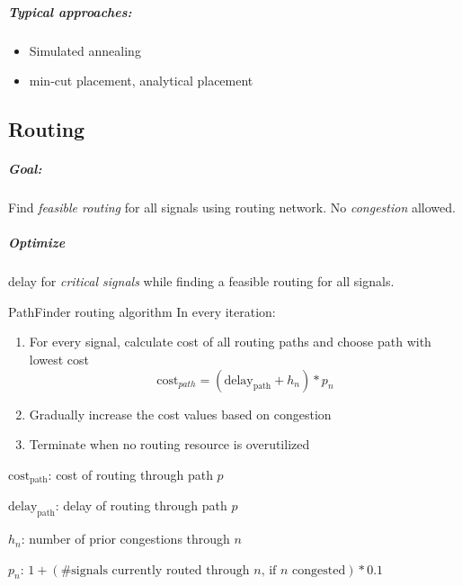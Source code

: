 \documentclass[a4paper]{article}
\begin{document}
\subparagraph{Typical approaches:}
\begin{itemize}
    \item Simulated annealing
    \item min-cut placement, analytical placement
\end{itemize}

\subsection{Routing}

\subparagraph{Goal:} Find \emph{feasible routing} for all signals using routing network. No \emph{congestion} allowed.

\subparagraph{Optimize} delay for \emph{critical signals} while finding a feasible routing for all signals.

\begin{mainbox}{PathFinder routing algorithm}
    In every iteration:
    \begin{enumerate}
        \item For every signal, calculate cost of all routing paths and choose path with lowest cost
        $$\text{cost}_{path} = (\text{delay}_\text{path} + h_n) * p_n$$
        \item Gradually increase the cost values based on congestion
        \item Terminate when no routing resource is overutilized
    \end{enumerate}

    \begin{itemize*}
        \item $\text{cost}_\text{path}$: cost of routing through path $p$
        \item $\text{delay}_\text{path}$: delay of routing through path $p$
        \item $h_n$: number of prior congestions through $n$
        \item $p_n$: $1 + (\text{\# signals currently routed through } n \text{, if } n \text{ congested}) * 0.1$
    \end{itemize*}
\end{mainbox}
\end{document}
